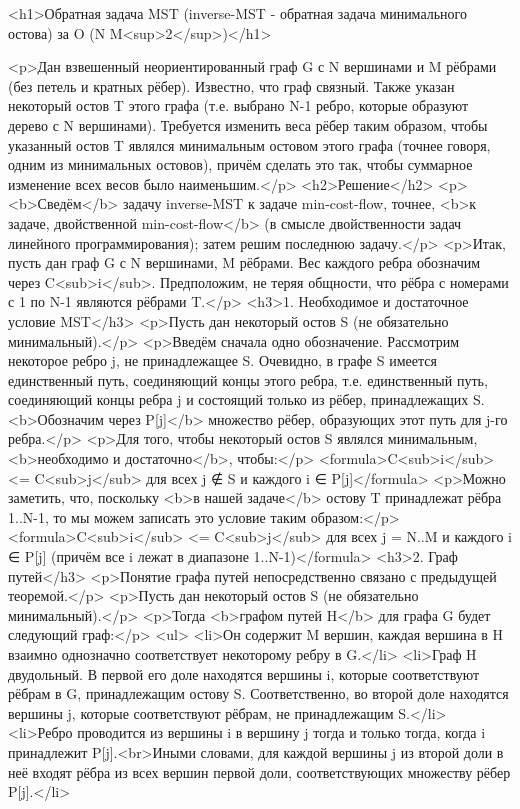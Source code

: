 <h1>Обратная задача MST (inverse-MST - обратная задача минимального остова) за O (N M<sup>2</sup>)</h1>

<p>Дан взвешенный неориентированный граф G с N вершинами и M рёбрами (без петель и кратных рёбер). Известно, что граф связный. Также указан некоторый остов T этого графа (т.е. выбрано N-1 ребро, которые образуют дерево с N вершинами). Требуется изменить веса рёбер таким образом, чтобы указанный остов T являлся минимальным остовом этого графа (точнее говоря, одним из минимальных остовов), причём сделать это так, чтобы суммарное изменение всех весов было наименьшим.</p>
<h2>Решение</h2>
<p><b>Сведём</b> задачу inverse-MST к задаче min-cost-flow, точнее, <b>к задаче, двойственной min-cost-flow</b> (в смысле двойственности задач линейного программирования); затем решим последнюю задачу.</p>
<p>Итак, пусть дан граф G с N вершинами, M рёбрами. Вес каждого ребра обозначим через C<sub>i</sub>. Предположим, не теряя общности, что рёбра с номерами с 1 по N-1 являются рёбрами T.</p>
<h3>1. Необходимое и достаточное условие MST</h3>
<p>Пусть дан некоторый остов S (не обязательно минимальный).</p>
<p>Введём сначала одно обозначение. Рассмотрим некоторое ребро j, не принадлежащее S. Очевидно, в графе S имеется единственный путь, соединяющий концы этого ребра, т.е. единственный путь, соединяющий концы ребра j и состоящий только из рёбер, принадлежащих S. <b>Обозначим через P[j]</b> множество рёбер, образующих этот путь для j-го ребра.</p>
<p>Для того, чтобы некоторый остов S являлся минимальным, <b>необходимо и достаточно</b>, чтобы:</p>
<formula>C<sub>i</sub> <= C<sub>j</sub> для всех j ∉ S и каждого i ∈ P[j]</formula>
<p>Можно заметить, что, поскольку <b>в нашей задаче</b> остову T принадлежат рёбра 1..N-1, то мы можем записать это условие таким образом:</p>
<formula>C<sub>i</sub> <= C<sub>j</sub> для всех j = N..M и каждого i ∈ P[j]
(причём все i лежат в диапазоне 1..N-1)</formula>
<h3>2. Граф путей</h3>
<p>Понятие графа путей непосредственно связано с предыдущей теоремой.</p>
<p>Пусть дан некоторый остов S (не обязательно минимальный).</p>
<p>Тогда <b>графом путей H</b> для графа G будет следующий граф:</p>
<ul>
<li>Он содержит M вершин, каждая вершина в H взаимно однозначно соответствует некоторому ребру в G.</li>
<li>Граф H двудольный. В первой его доле находятся вершины i, которые соответствуют рёбрам в G, принадлежащим остову S. Соответственно, во второй доле находятся вершины j, которые соответствуют рёбрам, не принадлежащим S.</li>
<li>Ребро проводится из вершины i в вершину j тогда и только тогда, когда i принадлежит P[j].<br>Иными словами, для каждой вершины j из второй доли в неё входят рёбра из всех вершин первой доли, соответствующих множеству рёбер P[j].</li>
